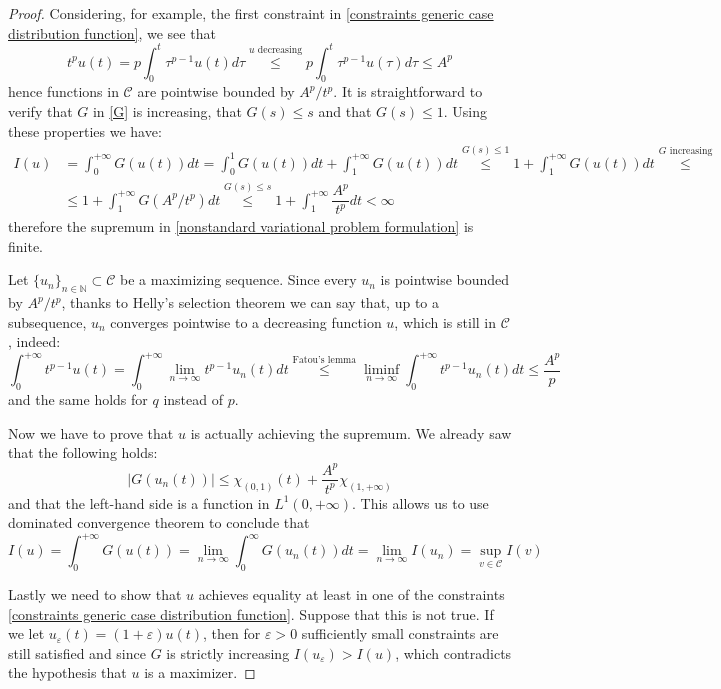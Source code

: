 \documentclass[corpo=11pt, stile=classica, tipotesi=custom,
greek, evenboxes, english]{toptesi}
\numberwithin{equation}{chapter}
\theoremstyle{remark}
\newcommand{\N}{\mathbb{N}} %
\begin{document}
\begin{proof}
	Considering, for example, the first constraint in \eqref{constraints generic case distribution function}, we see that
	\begin{equation*}
		t^p u(t) = p \int_0^t \tau^{p-1} u(t) d\tau \overset{u \text{ decreasing}}{\leq} p \int_0^t \tau^{p-1} u(\tau) d\tau \leq A^p
	\end{equation*}
	hence functions in $\mathcal{C}$ are pointwise bounded by $A^p/t^p$. It is straightforward to verify that $G$ in \eqref{G} is increasing, that $G(s) \leq s$ and that $G(s) \leq 1$. Using these properties we have:
	\begin{align*}
		I(u) &= \int_0^{+\infty} G(u(t))dt = \int_0^1 G(u(t))dt + \int_1^{+\infty} G(u(t))dt \overset{G(s) \leq 1}{\leq} 1 + \int_1^{+\infty} G(u(t))dt \overset{G \text{ increasing}}{\leq}\\ &\leq 1 + \int_1^{+\infty} G(A^p/t^p)dt \overset{G(s) \leq s}{\leq} 1 + \int_1^{+\infty} \dfrac{A^p}{t^p}dt < \infty
	\end{align*}
	therefore the supremum in \eqref{nonstandard variational problem formulation} is finite.
	
	Let $\{u_n\}_{n \in \N} \subset \mathcal{C}$ be a maximizing sequence. Since every $u_n$ is pointwise bounded by $A^p/t^p$, thanks to {\color{red}Helly's selection theorem} we can say that, up to a subsequence, $u_n$ converges pointwise to a decreasing function $u$, which is still in $\mathcal{C}$, indeed:
	\begin{equation*}
		\int_0^{+\infty} t^{p-1} u(t) = \int_0^{+\infty} \lim_{n \rightarrow \infty} t^{p-1} u_n(t) dt \overset{\text{Fatou's lemma}}{\leq} \liminf_{n \rightarrow \infty} \int_0^{+\infty} t^{p-1} u_n(t) dt \leq \dfrac{A^p}{p}
	\end{equation*}
	and the same holds for $q$ instead of $p$.
	
	Now we have to prove that $u$ is actually achieving the supremum. We already saw that the following holds:
	\begin{equation*}
		|G(u_n(t))| \leq \chi_{(0,1)}(t) + \dfrac{A^p}{t^p} \chi_{(1,+\infty)}
	\end{equation*}
	and that the left-hand side is a function in $L^1(0,+\infty)$. This allows us to use dominated convergence theorem to conclude that 
	\begin{equation*}
		I(u) = \int_0^{+\infty} G(u(t)) = \lim_{n \rightarrow \infty} \int_0^{\infty} G(u_n(t))dt = \lim_{n \rightarrow \infty} I(u_n) = \sup_{v \in \mathcal{C}} I(v)
	\end{equation*}

	Lastly we need to show that $u$ achieves equality at least in one of the constraints \eqref{constraints generic case distribution function}. Suppose that this is not true. If we let $u_{\varepsilon}(t) = (1+\varepsilon) u(t)$, then for $\varepsilon > 0$ sufficiently small constraints are still satisfied and since $G$ is strictly increasing $I(u_{\varepsilon}) > I(u)$, which contradicts the hypothesis that $u$ is a maximizer.
\end{proof}
\end{document}
